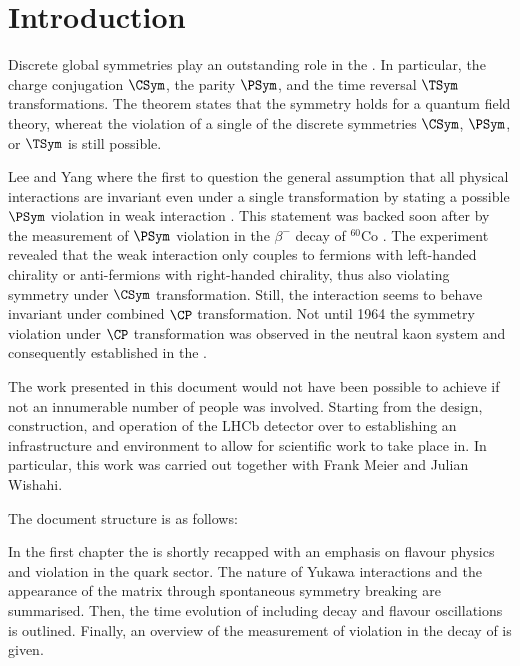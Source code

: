 
\chapter{Introduction}
\label{ch:introduction}

Discrete global symmetries play an outstanding role in the \SM. In particular,
the charge conjugation $\CSym$, the parity $\PSym$, and the time reversal
$\TSym$ transformations. The \CPT theorem \cite{set:cpt} states that the \CPT
symmetry holds for a quantum field theory, whereat the violation of a single of
the discrete symmetries $\CSym$, $\PSym$, or $\TSym$ is still possible.

Lee and Yang where the first to question the general assumption that all
physical interactions are invariant even under a single transformation by
stating a possible $\PSym$ violation in weak interaction \cite{Lee:1956qn}. This
statement was backed soon after by the measurement of $\PSym$ violation in the
$\beta^{-}$ decay of ${}^{60}\text{Co}$ \cite{Wu:1957my}. The experiment
revealed that the weak interaction only couples to fermions with left-handed
chirality or anti-fermions with right-handed chirality, thus also violating
symmetry under $\CSym$ transformation. Still, the interaction seems to behave
invariant under combined $\CP$ transformation. Not until 1964 the symmetry
violation under $\CP$ transformation was observed in the neutral kaon system
\cite{Christenson:1964fg} and consequently established in the \SM.

The work presented in this document would not have been possible to achieve if
not an innumerable number of people was involved. Starting from the design,
construction, and operation of the \acs{LHCb} detector over to establishing an
infrastructure and environment to allow for scientific work to take place in. In
particular, this work was carried out together with Frank Meier and Julian
Wishahi.

\par\noindent\newline
The document structure is as follows:

In the first chapter the \SM is shortly recapped with an emphasis on flavour
physics and \CP violation in the quark sector. The nature of Yukawa
interactions and the appearance of the \CKM matrix through spontaneous symmetry
breaking are summarised. Then, the time evolution of \Bmesons including decay
and flavour oscillations is outlined. Finally, an overview of the measurement of
\CP violation in the decay of \BdToJpsiKS is given.

